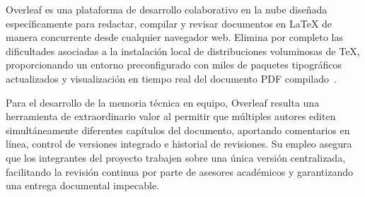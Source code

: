 Overleaf es una plataforma de desarrollo colaborativo en la nube diseñada específicamente para redactar, compilar y revisar documentos en \LaTeX{} de manera concurrente desde cualquier navegador web. Elimina por completo las dificultades asociadas a la instalación local de distribuciones voluminosas de \TeX{}, proporcionando un entorno preconfigurado con miles de paquetes tipográficos actualizados y visualización en tiempo real del documento PDF compilado~\cite{overleaf_latex}.

Para el desarrollo de la memoria técnica en equipo, Overleaf resulta una herramienta de extraordinario valor al permitir que múltiples autores editen simultáneamente diferentes capítulos del documento, aportando comentarios en línea, control de versiones integrado e historial de revisiones. Su empleo asegura que los integrantes del proyecto trabajen sobre una única versión centralizada, facilitando la revisión continua por parte de asesores académicos y garantizando una entrega documental impecable.
